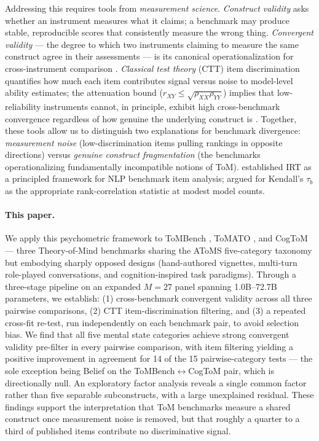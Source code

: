 \documentclass{article} %
\begin{document}
Addressing this requires tools from \textit{measurement science}.
\textit{Construct validity} \citep{cronbach1955construct,
salaudeen2025measurement} asks whether an instrument measures what it
claims; a benchmark may produce stable, reproducible scores that
consistently measure the wrong thing.
\textit{Convergent validity} --- the degree to which two instruments
claiming to measure the same construct agree in their assessments ---
is its canonical operationalization for cross-instrument comparison
\citep{perlitz2024benchbench}.
\textit{Classical test theory} (CTT) item discrimination
\citep{furr2014psychometrics, edelen2007applying} quantifies how much
each item contributes signal versus noise to model-level ability
estimates; the attenuation bound ($r_{XY} \leq
\sqrt{\rho_{XX}\rho_{YY}}$) implies that low-reliability instruments
cannot, in principle, exhibit high cross-benchmark convergence
regardless of how genuine the underlying construct is
\citep{furr2014psychometrics}.
Together, these tools allow us to distinguish two explanations for
benchmark divergence: \textit{measurement noise} (low-discrimination
items pulling rankings in opposite directions) versus \textit{genuine
construct fragmentation} (the benchmarks operationalizing fundamentally
incompatible notions of ToM).
\citet{lalor2016building} established IRT as a principled framework for
NLP benchmark item analysis; \citet{burnell2023revealing} argued for
Kendall's $\tau_b$ as the appropriate rank-correlation statistic at
modest model counts.
 
\paragraph{This paper.}
We apply this psychometric framework to ToMBench \citep{chen2024tombench},
ToMATO \citep{shinoda2025tomato}, and CogToM \citep{tong2026cogtom} --- three Theory-of-Mind benchmarks sharing the AToMS five-category taxonomy \citep{beaudoin2020atoms} but embodying sharply opposed designs (hand-authored vignettes, multi-turn role-played conversations, and cognition-inspired task paradigms).
Through a three-stage pipeline on an expanded $M{=}27$ panel spanning 1.0B--72.7B parameters, we establish: (1) cross-benchmark convergent validity across all three pairwise comparisons, (2) CTT item-discrimination filtering, and (3) a repeated cross-fit re-test, run independently on each benchmark pair, to avoid selection bias.
We find that all five mental state categories achieve strong convergent validity pre-filter in every pairwise comparison, with item filtering yielding a positive improvement in agreement for 14 of the 15 pairwise-category tests --- the sole exception being Belief on the ToMBench$\leftrightarrow$CogToM pair, which is directionally null.
An exploratory factor analysis reveals a single common factor rather than five separable subconstructs, with a large unexplained residual.
These findings support the interpretation that ToM benchmarks measure a shared construct once measurement noise is removed, but that roughly a quarter to a third of published items contribute no discriminative signal.
 
\end{document}
